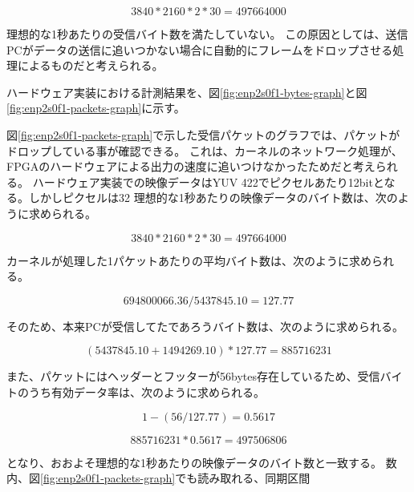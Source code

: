 \[ 3840 * 2160 * 2 * 30 = 497664000 \]

理想的な1秒あたりの受信バイト数を満たしていない。
この原因としては、送信PCがデータの送信に追いつかない場合に自動的にフレームをドロップさせる処理によるものだと考えられる。

ハードウェア実装における計測結果を、図\ref{fig:enp2s0f1-bytes-graph}と図\ref{fig:enp2s0f1-packets-graph}に示す。

図\ref{fig:enp2s0f1-packets-graph}で示した受信パケットのグラフでは、パケットがドロップしている事が確認できる。
これは、カーネルのネットワーク処理が、FPGAのハードウェアによる出力の速度に追いつけなかったためだと考えられる。
ハードウェア実装での映像データはYUV 422でピクセルあたり12bitとなる。しかしピクセルは32
理想的な1秒あたりの映像データのバイト数は、次のように求められる。

\[ 3840 * 2160 * 2 * 30 = 497664000 \]

カーネルが処理した1パケットあたりの平均バイト数は、次のように求められる。

\[ 694800066.36 / 5437845.10 = 127.77 \]

そのため、本来PCが受信してたであろうバイト数は、次のように求められる。

\[ (5437845.10 + 1494269.10) * 127.77 = 885716231 \]

また、パケットにはヘッダーとフッターが56bytes存在しているため、受信バイトのうち有効データ率は、次のように求められる。

\[ 1-(56/127.77) = 0.5617 \]

\[ 885716231 * 0.5617 = 497506806 \]

となり、おおよそ理想的な1秒あたりの映像データのバイト数と一致する。
数内、図\ref{fig:enp2s0f1-packets-graph}でも読み取れる、同期区間

%




%
%
%
%

